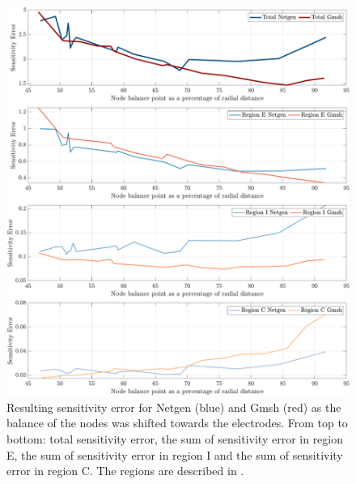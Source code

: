 \begin{figure}
  \includegraphics[width=\columnwidth]{chapter4-mesh_refinement/imgs/m-mesh_sens_error_regions_split.pdf}
  \caption[Sensitivity error with shifting node balance]{\label{fig:balance_sens}
  Resulting sensitivity error for Netgen (blue) and Gmsh (red) as the balance of the nodes
  was shifted towards the electrodes. From top to bottom: total sensitivity error, the sum of 
  sensitivity error in region E, the sum of sensitivity error in region I and the sum of
  sensitivity error in region C. The regions are described in .}
\end{figure}

  
%  
%  
  
